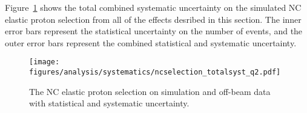     Figure~\ref{fig:systall} shows the total combined systematic uncertainty on
    the simulated NC elastic proton selection from all of the effects desribed
    in this section. The inner error bars represent the statistical uncertainty
    on the number of events, and the outer error bars represent the combined
    statistical and systematic uncertainty.
    \begin{figure}[ht]
      \centering
      \texttt{[image: figures/analysis/systematics/ncselection\_totalsyst\_q2.pdf]}
      \caption{The NC elastic proton selection on simulation and off-beam data
      with statistical and systematic uncertainty.}
      \label{fig:systall}
    \end{figure}


